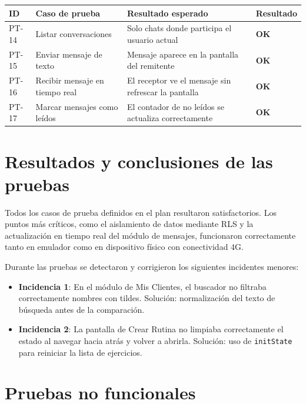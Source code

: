 \begin{longtable}{@{}p{1cm}p{5cm}p{5cm}p{2.5cm}@{}}
\toprule
\textbf{ID} & \textbf{Caso de prueba} & \textbf{Resultado esperado} & \textbf{Resultado} \\
\midrule
\endhead
PT-14 & Listar conversaciones & Solo chats donde participa el usuario actual & \textcolor{green!60!black}{\textbf{OK}} \\
PT-15 & Enviar mensaje de texto & Mensaje aparece en la pantalla del remitente & \textcolor{green!60!black}{\textbf{OK}} \\
PT-16 & Recibir mensaje en tiempo real & El receptor ve el mensaje sin refrescar la pantalla & \textcolor{green!60!black}{\textbf{OK}} \\
PT-17 & Marcar mensajes como leídos & El contador de no leídos se actualiza correctamente & \textcolor{green!60!black}{\textbf{OK}} \\
\bottomrule
\end{longtable}

\section{Resultados y conclusiones de las pruebas}

Todos los casos de prueba definidos en el plan resultaron satisfactorios. Los puntos más críticos, como el aislamiento de datos mediante RLS y la actualización en tiempo real del módulo de mensajes, funcionaron correctamente tanto en emulador como en dispositivo físico con conectividad 4G.

Durante las pruebas se detectaron y corrigieron los siguientes incidentes menores:

\begin{itemize}
  \item \textbf{Incidencia 1}: En el módulo de Mis Clientes, el buscador no filtraba correctamente nombres con tildes. Solución: normalización del texto de búsqueda antes de la comparación.
  \item \textbf{Incidencia 2}: La pantalla de Crear Rutina no limpiaba correctamente el estado al navegar hacia atrás y volver a abrirla. Solución: uso de \texttt{initState} para reiniciar la lista de ejercicios.
\end{itemize}

\section{Pruebas no funcionales}

